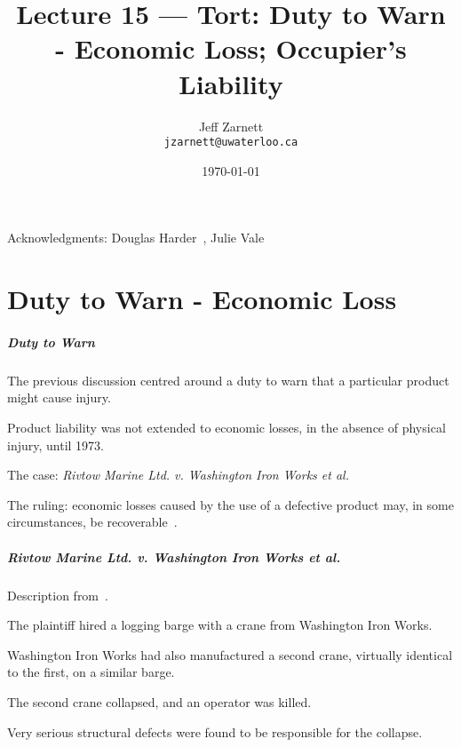 

\title{Lecture 15 --- Tort: Duty to Warn - Economic Loss; Occupier's Liability }

\author{Jeff Zarnett \\ \small \texttt{jzarnett@uwaterloo.ca}}
\date{\today}




\begin{frame}
  \titlepage

\begin{center}
  \small{Acknowledgments: Douglas Harder~\cite{dwh}, Julie Vale~\cite{jv}}
  \end{center}
\end{frame}

\part{Duty to Warn - Economic Loss}

\begin{frame}
\partpage
\end{frame}


\begin{frame}
\frametitle{Duty to Warn}

The previous discussion centred around a duty to warn that a particular product might cause injury.

Product liability was not extended to economic losses, in the absence of physical injury, until 1973.

The case: \textit{Rivtow Marine Ltd. v. Washington Iron Works et al.}

The ruling: economic losses caused by the use of a defective product may, in some circumstances, be recoverable~\cite{lpe}. 

\end{frame}



\begin{frame}
\frametitle{\textit{Rivtow Marine Ltd. v. Washington Iron Works et al.}}

Description from~\cite{lpe}.

The plaintiff hired a logging barge with a crane from Washington Iron Works.

Washington Iron Works had also manufactured a second crane, virtually identical to the first, on a similar barge.

The second crane collapsed, and an operator was killed.

Very serious structural defects were found to be responsible for the collapse.

\end{frame}



